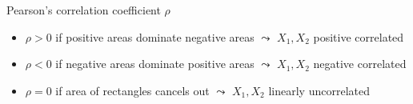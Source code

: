 \documentclass[11pt,compress,t,notes=noshow, aspectratio=169, xcolor=table]{beamer}
\begin{document}
\begin{frame}{Pearson's correlation coefficient $\rho$}
\medskip
\pause
\begin{itemize}
    \item $\rho > 0$ if {\color{ggblue}positive areas} dominate {\color{ggred}negative areas} 
    $\leadsto$ $X_1, X_2$ positive correlated
    \item $\rho < 0$ if {\color{ggred}negative areas} dominate {\color{ggblue}positive areas} 
    $\leadsto$ $X_1, X_2$ negative correlated
    \item $\rho = 0$ if area of rectangles cancels out
    $\leadsto$ $X_1, X_2$ linearly uncorrelated
\end{itemize}

\end{frame}
\end{document}
